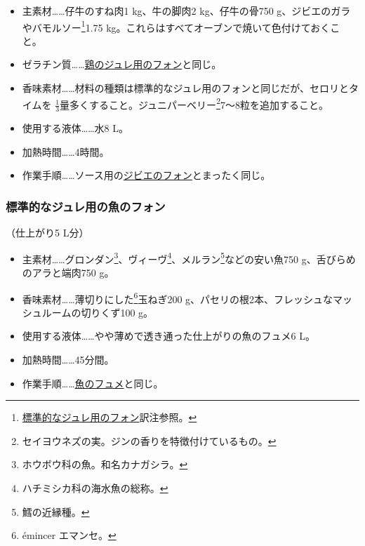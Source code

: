 \begin{recette}
\begin{itemize}
\item
  主素材\ldots{}\ldots{}仔牛のすね肉1 kg、牛の脚肉2 kg、仔牛の骨750
  g、ジビエのガラやバモルソー\footnote{\protect\hyperlink{fonds-pour-gelee-ordinaire}{標準的なジュレ用のフォン}訳注参照。}1.75
  kg。これらはすべてオーブンで焼いて色付けておくこと。
\item
  ゼラチン質\ldots{}\ldots{}\protect\hyperlink{fonds-pour-gelee-de-volaille}{鶏のジュレ用のフォン}と同じ。
\item
  香味素材\ldots{}\ldots{}材料の種類は標準的なジュレ用のフォンと同じだが、セロリとタイムを
  \(\frac{1}{3}\)量多くすること。ジュニパーベリー\footnote{セイヨウネズの実。ジンの香りを特徴付けているもの。}7〜8粒を追加すること。
\item
  使用する液体\ldots{}\ldots{}水8 L。
\item
  加熱時間\ldots{}\ldots{}4時間。
\item
  作業手順\ldots{}\ldots{}ソース用の\protect\hyperlink{fonds-de-gibier}{ジビエのフォン}とまったく同じ。
\end{itemize}

\hypertarget{fonds-de-poisson-pour-gelee-ordinaire}{%
\subsubsection{標準的なジュレ用の魚のフォン}\label{fonds-de-poisson-pour-gelee-ordinaire}}



（仕上がり5 L分）

\begin{itemize}
\item
  主素材\ldots{}\ldots{}グロンダン\footnote{ホウボウ科の魚。和名カナガシラ。}、ヴィーヴ\footnote{ハチミシカ科の海水魚の総称。}、メルラン\footnote{鱈の近縁種。}などの安い魚750
  g、舌びらめのアラと端肉750 g。
\item
  香味素材\ldots{}\ldots{}薄切りにした\footnote{émincer エマンセ。}玉ねぎ200
  g、パセリの根2本、フレッシュなマッシュルームの切りくず100 g。
\item
  使用する液体\ldots{}\ldots{}やや薄めで透き通った仕上がりの魚のフュメ6
  L。
\item
  加熱時間\ldots{}\ldots{}45分間。
\item
  作業手順\ldots{}\ldots{}\protect\hyperlink{fumet-de-poisson}{魚のフュメ}と同じ。
\end{itemize}


\end{recette}
